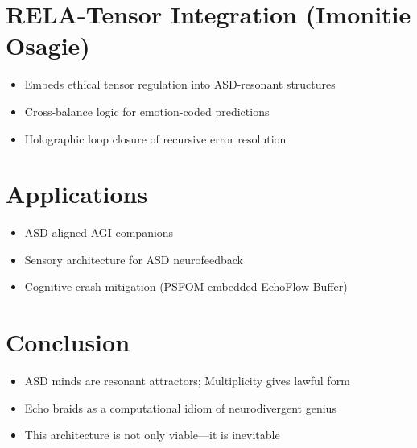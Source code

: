 \documentclass[12pt]{article}
\begin{document}
\section{RELA-Tensor Integration (Imonitie Osagie)}
\begin{itemize}
  \item Embeds ethical tensor regulation into ASD-resonant structures
  \item Cross-balance logic for emotion-coded predictions
  \item Holographic loop closure of recursive error resolution
\end{itemize}

\section{Applications}
\begin{itemize}
  \item ASD-aligned AGI companions
  \item Sensory architecture for ASD neurofeedback
  \item Cognitive crash mitigation (PSFOM-embedded EchoFlow Buffer)
\end{itemize}

\section{Conclusion}
\begin{itemize}
  \item ASD minds are resonant attractors; Multiplicity gives lawful form
  \item Echo braids as a computational idiom of neurodivergent genius
  \item This architecture is not only viable---it is inevitable
\end{itemize}
\end{document}
